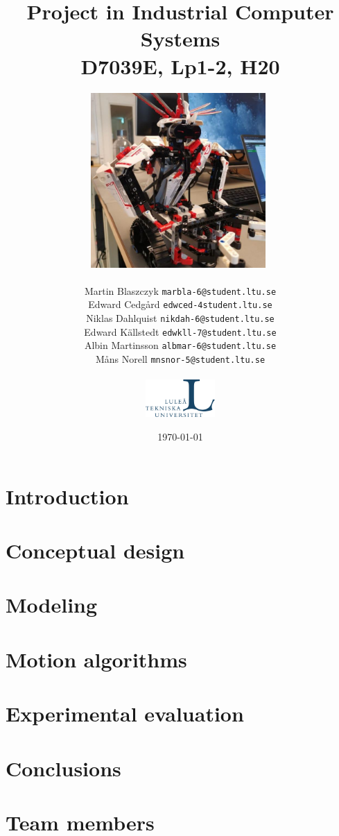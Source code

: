 \documentclass{report}
\title{Project in Industrial Computer Systems\\
D7039E, Lp1-2, H20}
\author{\includegraphics[width=0.5\textwidth]{chapters/img/robot.jpg}\ \\ \\
Martin Blaszczyk {\tt marbla-6@student.ltu.se}\\
Edward Cedgård {\tt edwced-4student.ltu.se}\\
Niklas Dahlquist {\tt nikdah-6@student.ltu.se}\\ 
Edward Källstedt {\tt edwkll-7@student.ltu.se}\\
Albin Martinsson {\tt albmar-6@student.ltu.se}\\
Måns Norell {\tt mnsnor-5@student.ltu.se}\\ \\
\includegraphics[width=0.2\textwidth]{chapters/img/ltu_swe.jpg}}
\date{\today}
\begin{document}
\maketitle
\begin{abstract}
\end{abstract}

\chapter*{Introduction}


\chapter*{Conceptual design}


\chapter*{Modeling}


\chapter*{Motion algorithms}


\chapter*{Experimental evaluation}


\chapter*{Conclusions}


\appendix
\chapter{Team members}

\end{document}
